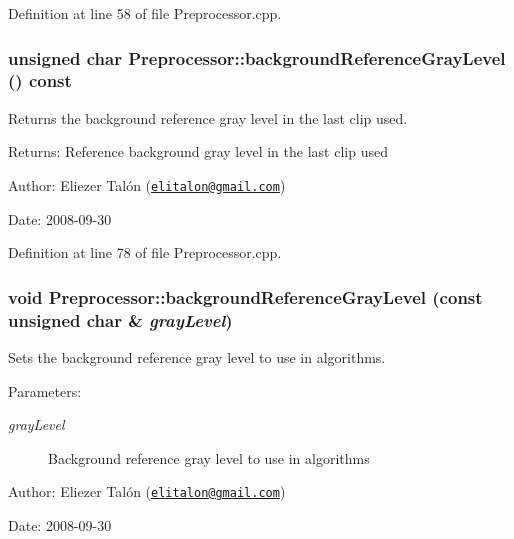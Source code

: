 Definition at line 58 of file Preprocessor.cpp.\hypertarget{class_preprocessor_9a2684181b5f43051fe53d7d2950dd36}{
\subsubsection[backgroundReferenceGrayLevel]{\setlength{\rightskip}{0pt plus 5cm}unsigned char Preprocessor::backgroundReferenceGrayLevel () const}}
\label{class_preprocessor_9a2684181b5f43051fe53d7d2950dd36}


Returns the background reference gray level in the last clip used. 

\begin{Desc}
\item[Returns:]Reference background gray level in the last clip used\end{Desc}
\begin{Desc}
\item[Author:]Eliezer Talón (\href{mailto:elitalon@gmail.com}{\tt elitalon@gmail.com}) \end{Desc}
\begin{Desc}
\item[Date:]2008-09-30 \end{Desc}


Definition at line 78 of file Preprocessor.cpp.\hypertarget{class_preprocessor_03340329e31bd1f01ace27d77b5616ef}{
\subsubsection[backgroundReferenceGrayLevel]{\setlength{\rightskip}{0pt plus 5cm}void Preprocessor::backgroundReferenceGrayLevel (const unsigned char \& {\em grayLevel})}}
\label{class_preprocessor_03340329e31bd1f01ace27d77b5616ef}


Sets the background reference gray level to use in algorithms. 

\begin{Desc}
\item[Parameters:]
\begin{description}
\item[{\em grayLevel}]Background reference gray level to use in algorithms\end{description}
\end{Desc}
\begin{Desc}
\item[Author:]Eliezer Talón (\href{mailto:elitalon@gmail.com}{\tt elitalon@gmail.com}) \end{Desc}
\begin{Desc}
\item[Date:]2008-09-30 \end{Desc}


